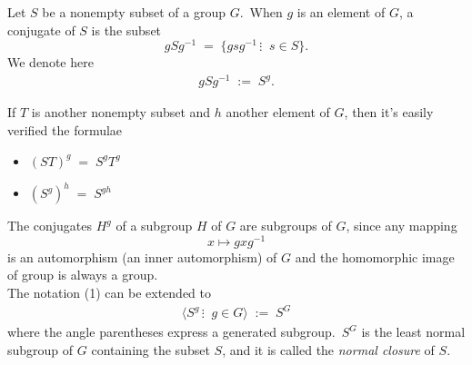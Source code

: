 \documentclass[12pt]{article}
\theoremstyle{definition}
\begin{document}
Let $S$ be a nonempty subset of a group $G$.\, When $g$ is an element of $G$, a conjugate of $S$ is the subset
$$gSg^{-1} \;=\; \{gsg^{-1}\,\vdots\;\; s \in S\}.$$
We denote here
\begin{align}
gSg^{-1} \;:=\; S^g.
\end{align}

If $T$ is another nonempty subset and $h$ another element of $G$, then it's easily verified the formulae
\begin{itemize}
\item $(ST)^g \;=\; S^gT^g$
\item $(S^g)^h \;=\; S^{gh}$
\end{itemize}

The conjugates $H^g$ of a subgroup $H$ of $G$ are subgroups of $G$, since any mapping
$$x \mapsto gxg^{-1}$$
is an automorphism (an inner automorphism) of $G$ and the homomorphic image of group is always a group.\\

The notation (1) can be extended to
\begin{align}
\langle S^g\,\vdots\;\; g \in G\rangle \;:=\; S^G
\end{align}
where the angle parentheses express a generated subgroup.\, $S^G$ is the least normal subgroup of $G$ containing the subset $S$, and it is called the \emph{normal closure} of $S$.\\




\end{document}
